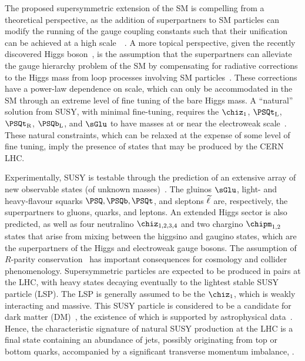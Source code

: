 The proposed supersymmetric extension of the SM is compelling from a
theoretical perspective, as the addition of superpartners to SM
particles can modify the running of the gauge coupling constants such
that their unification can be achieved at a high
scale~~\cite{Dimopoulos:1981yj, Ibanez:1981yh, Marciano:1981un}. A
more topical perspective, given the recently discovered Higgs
boson~\cite{ref:atlashiggsdiscovery, ref:cmshiggsdiscovery,
  ref:cmshiggsdiscoverylong}, is the assumption that the superpartners
can alleviate the gauge hierarchy problem of the SM by compensating
for radiative corrections to the Higgs mass from loop processes
involving SM particles~\cite{ref:hierarchy1, ref:hierarchy2}. These
corrections have a power-law dependence on scale, which can only be
accommodated in the SM through an extreme level of fine tuning of the
bare Higgs mass. A ``natural'' solution from SUSY, with minimal
fine-tuning, requires the $\chiz_1$, $\PSQt_\text{L}$,
$\PSQt_\text{R}$, $\PSQb_\text{L}$, and $\sGlu$ to have masses at or
near the electroweak scale~\cite{ref:barbierinsusy}. These natural
constraints, which can be relaxed at the expense of some level of fine
tuning, imply the presence of states that may be produced by the CERN
LHC.

Experimentally, SUSY is testable through the prediction of an
extensive array of new observable states (of unknown
masses)~\cite{ref:SUSY4, ref:SUSY2}. The gluinos $\sGlu$, light- and
heavy-flavour squarks $\PSQ, \PSQb, \PSQt$, and sleptons $\widetilde{\ell}$ are,
respectively, the superpartners to gluons, quarks, and leptons. An
extended Higgs sector is also predicted, as well as four neutralino
$\chiz_{1,2,3,4}$ and two chargino $\chipm_{1,2}$ states that arise
from mixing between the higgsino and gaugino states, which are the
superpartners of the Higgs and electroweak gauge bosons. 
The assumption of $R$-parity conservation~\cite{Farrar:1978xj} has
important consequences for cosmology and collider
phenomenology. Supersymmetric particles are expected to be produced in
pairs at the LHC, with heavy states decaying eventually to the
lightest stable SUSY particle (LSP). The LSP is generally assumed to
be the $\chiz_1$, which is weakly interacting and massive. This SUSY
particle is considered to be a candidate for dark matter
(DM)~\cite{Jungman:1995df}, the existence of which is supported by
astrophysical data~\cite{1674-1137-38-9-090001}.  Hence, the
characteristic signature of natural SUSY production at the LHC is a
final state containing an abundance of jets, possibly originating from
top or bottom quarks, accompanied by a significant transverse momentum
imbalance, \ptvecmiss.

